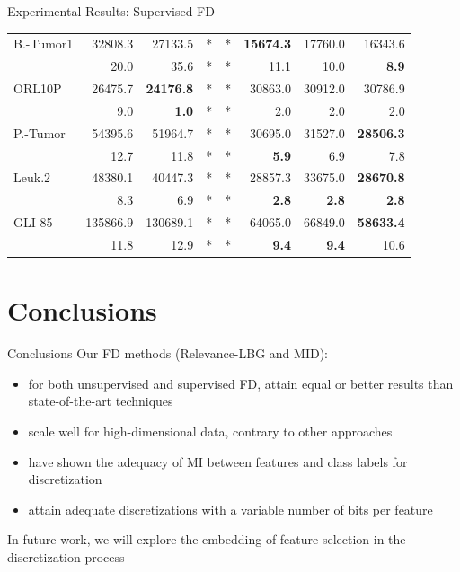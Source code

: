 \documentclass{beamer}
\begin{document}
\begin{frame}{Experimental Results: Supervised FD}
\begin{table} [t]
{\begin{tabular}{l|r|r|r|r|r|r|r|}
	 \multicolumn{1}{|l|}{B.-Tumor1}  & 32808.3 & 27133.5 & * & * & \textbf{15674.3} & 17760.0 & 16343.6 \\ \cline{2-8}
   \multicolumn{1}{|l|}{ }     & 20.0 & 35.6 & * & * & 11.1 & 10.0 & \textbf{8.9} \\ \hline

   \multicolumn{1}{|l|}{ORL10P}  & 26475.7 & \textbf{24176.8} & * & * & 30863.0 & 30912.0 & 30786.9\\ \cline{2-8}
   \multicolumn{1}{|l|}{ }     & 9.0 & \textbf{1.0} & * & * & 2.0 & 2.0 & 2.0 \\ \hline

   \multicolumn{1}{|l|}{P.-Tumor}  & 54395.6 & 51964.7 & * & * & 30695.0 & 31527.0 & \textbf{28506.3} \\ \cline{2-8}
   \multicolumn{1}{|l|}{ }    & 12.7  & 11.8 & * & * & \textbf{5.9} & 6.9 & 7.8   \\ \hline

	 \multicolumn{1}{|l|}{Leuk.2}  & 48380.1 & 40447.3 & * & * & 28857.3 & 33675.0 & \textbf{28670.8} \\ \cline{2-8}
   \multicolumn{1}{|l|}{ }     & 8.3 & 6.9 & * & * &  \textbf{2.8} & \textbf{2.8} & \textbf{2.8} \\ \hline

   \multicolumn{1}{|l|}{GLI-85} & 135866.9 & 130689.1 & * & * & 64065.0 & 66849.0 & \textbf{58633.4} \\ \cline{2-8}
   \multicolumn{1}{|l|}{ }     & 11.8 & 12.9 & * & * & \textbf{9.4} & \textbf{9.4} & 10.6 \\ \hline
\end{tabular}}
\end{table}
\end{frame}


\section[Conclusions]{Conclusions}
\begin{frame}{Conclusions}
Our FD methods (Relevance-LBG and MID):
\begin{itemize}%
		\item for both unsupervised and supervised FD, attain equal or better results than state-of-the-art techniques
	  \item scale well for high-dimensional data, contrary to other approaches
	  \item have shown the adequacy of MI between features and class labels for discretization
		\item attain adequate discretizations with a variable number
of bits per feature
\end{itemize}

\vfill
In future work, we will explore the embedding of feature selection
in the discretization process
\end{frame}
\end{document}
